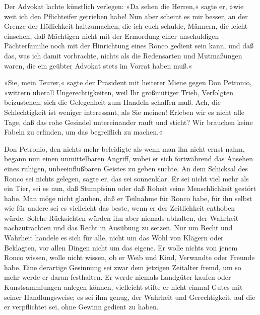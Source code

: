 Der Advokat lachte künstlich verlegen: »Da sehen die Herren,« sagte
er, »wie weit ich den Pflichteifer getrieben habe! Nun aber scheint
es mir besser, an der Grenze der Höflichkeit haltzumachen, die ich
euch schulde, Männern, die leicht einsehen, daß Mächtigen nicht mit
der Ermordung einer unschuldigen Pächterfamilie noch mit der
Hinrichtung eines Ronco gedient sein kann, und daß das, was ich
damit vorbrachte, nichts als die Redensarten und Mutmaßungen waren,
die ein geübter Advokat stets im Vorrat haben muß.«

»Sie, mein Teurer,« sagte der Präsident mit heiterer Miene gegen
Don Petronio, »wittern überall Ungerechtigkeiten, weil Ihr
großmütiger Trieb, Verfolgten beizustehen, sich die Gelegenheit zum
Handeln schaffen muß. Ach, die Schlechtigkeit ist weniger
interessant, als Sie meinen! Erleben wir es nicht alle Tage, daß
das rohe Gesindel untereinander rauft und sticht? Wir brauchen
keine Fabeln zu erfinden, um das begreiflich zu machen.«

Don Petronio, den nichts mehr beleidigte als wenn man ihn nicht
ernst nahm, begann nun einen unmittelbaren Angriff,\pagenum{[77]}
wobei er sich fortwährend das Ansehen eines ruhigen,
unbeeinflußbaren Geistes zu geben suchte. An dem Schicksal des
Ronco sei nichts gelegen, sagte er, das sei sonnenklar. Er sei
nicht viel mehr als ein Tier, sei es nun, daß Stumpfsinn oder daß
Roheit seine Menschlichkeit gestört habe. Man möge nicht glauben,
daß er Teilnahme für Ronco habe, für ihn selbst wie für andere sei
es vielleicht das beste, wenn er der Zeitlichkeit enthoben würde.
Solche Rücksichten würden ihn aber niemals abhalten, der Wahrheit
nachzutrachten und das Recht in Ausübung zu setzen. Nur um Recht
und Wahrheit handele es sich für alle, nicht um das Wohl von
Klägern oder Beklagten, vor allen Dingen nicht um das eigene. Er
wolle nichts von jenem Ronco wissen, wolle nicht wissen, ob er Weib
und Kind, Verwandte oder Freunde habe. Eine derartige Gesinnung sei
zwar dem jetzigen Zeitalter fremd, um so mehr werde er daran
festhalten. Er werde niemals Landgüter kaufen oder Kunstsammlungen
anlegen können, vielleicht stifte er nicht einmal Gutes mit seiner
Handlungsweise; es sei ihm genug, der Wahrheit und Gerechtigkeit,
auf die er verpflichtet sei, ohne Gewinn gedient zu haben.

